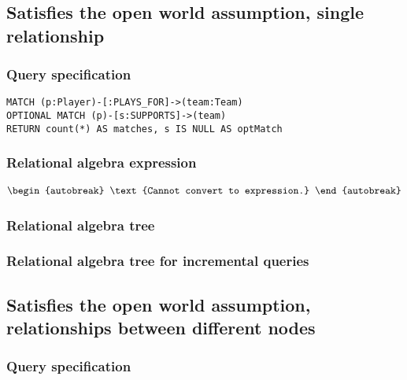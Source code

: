 
\subsection{Satisfies the open world assumption, single relationship}

\subsubsection*{Query specification}

\begin{lstlisting}
MATCH (p:Player)-[:PLAYS_FOR]->(team:Team)
OPTIONAL MATCH (p)-[s:SUPPORTS]->(team)
RETURN count(*) AS matches, s IS NULL AS optMatch
\end{lstlisting}

\subsubsection*{Relational algebra expression}

\begin{align*}
\begin{autobreak}
\text{Cannot convert to expression.}
\end{autobreak}
\end{align*}

\subsubsection*{Relational algebra tree}


\subsubsection*{Relational algebra tree for incremental queries}


\subsection{Satisfies the open world assumption, relationships between different nodes}

\subsubsection*{Query specification}

